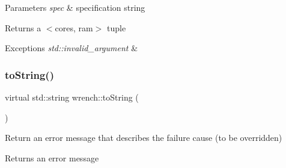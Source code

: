 \begin{DoxyParams}{Parameters}
{\em spec} & specification string \\
\hline
\end{DoxyParams}
\begin{DoxyReturn}{Returns}
a $<$cores, ram$>$ tuple 
\end{DoxyReturn}

\begin{DoxyExceptions}{Exceptions}
{\em std\+::invalid\+\_\+argument} & \\
\hline
\end{DoxyExceptions}
\mbox{\label{namespacewrench_a12c0e5148c72aa18e5e9119514a2d100}} 
\subsubsection{\texorpdfstring{to\+String()}{toString()}}
{\footnotesize\ttfamily virtual std\+::string wrench\+::to\+String (\begin{DoxyParamCaption}{ }\end{DoxyParamCaption})\hspace{0.3cm}{\ttfamily [pure virtual]}}



Return an error message that describes the failure cause (to be overridden) 

\begin{DoxyReturn}{Returns}
an error message 
\end{DoxyReturn}
